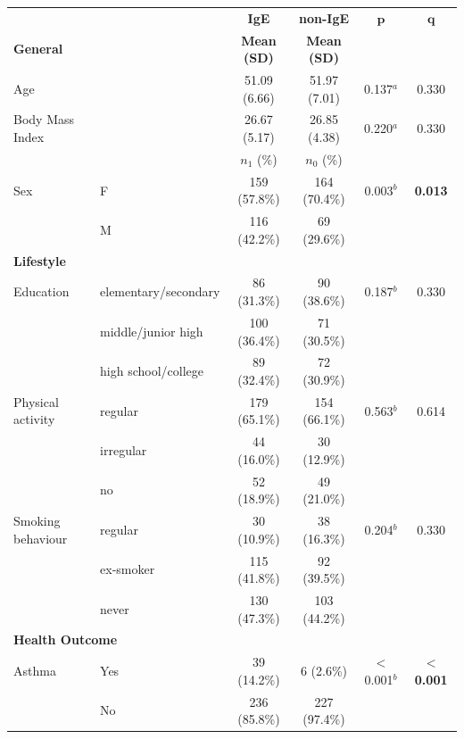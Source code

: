 \begin{table}[h!]
\centering
\setlength{\tabcolsep}{4pt}
\begin{tabular}{llcccc}

 &  & \textbf{IgE} & \textbf{non-IgE} & $\boldsymbol{p}$ & $\boldsymbol{q}$ \\

\multicolumn{2}{l}{\textbf{General}} & \textbf{Mean (SD)} & \textbf{Mean (SD)} & & \\

Age &  & 51.09 (6.66) & 51.97 (7.01) & 0.137$^{a}$ & 0.330 \\
Body Mass Index &  & 26.67 (5.17) & 26.85 (4.38) & 0.220$^{a}$ & 0.330 \\

 & & $n_{1}$ (\%) & $n_{0}$ (\%) & & \\

Sex & F & 159 (57.8\%) & 164 (70.4\%) & 0.003$^{b}$ & \textbf{0.013} \\
 & M & 116 (42.2\%) & 69 (29.6\%) &  &  \\

\multicolumn{6}{l}{\textbf{Lifestyle}} \\

Education & elementary/secondary & 86 (31.3\%) & 90 (38.6\%) & 0.187$^{b}$ & 0.330 \\
 & middle/junior high & 100 (36.4\%) & 71 (30.5\%) &  &  \\
 & high school/college & 89 (32.4\%) & 72 (30.9\%) &  &  \\

Physical activity & regular & 179 (65.1\%) & 154 (66.1\%) & 0.563$^{b}$ & 0.614 \\
 & irregular & 44 (16.0\%) & 30 (12.9\%) &  &  \\
 & no & 52 (18.9\%) & 49 (21.0\%) &  &  \\

Smoking behaviour & regular & 30 (10.9\%) & 38 (16.3\%) & 0.204$^{b}$ & 0.330 \\
 & ex-smoker & 115 (41.8\%) & 92 (39.5\%) &  &  \\
 & never & 130 (47.3\%) & 103 (44.2\%) &  &  \\

\multicolumn{6}{l}{\textbf{Health Outcome}} \\

Asthma & Yes & 39 (14.2\%) & 6 (2.6\%) & $<$0.001$^{b}$ & \textbf{$<$0.001} \\
 & No & 236 (85.8\%) & 227 (97.4\%) &  &  \\


\end{tabular}
\end{table}
